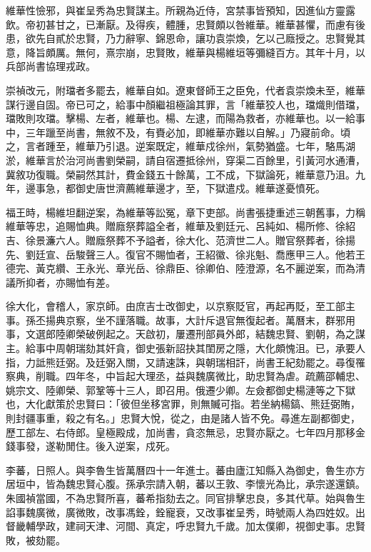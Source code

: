 \begin{pinyinscope}
維華性憸邪，與崔呈秀為忠賢謀主。所親為近侍，宮禁事皆預知，因進仙方靈露飲。帝初甚甘之，已漸厭。及得疾，體腫，忠賢頗以咎維華。維華甚懼，而慮有後患，欲先自貳於忠賢，乃力辭寧、錦恩命，讓功袁崇煥，乞以己廕授之。忠賢覺其意，降旨頗厲。無何，熹宗崩，忠賢敗，維華與楊維垣等彌縫百方。其年十月，以兵部尚書協理戎政。

崇禎改元，附璫者多罷去，維華自如。遼東督師王之臣免，代者袁崇煥未至，維華謀行邊自固。帝已可之，給事中顏繼祖極論其罪，言「維華狡人也，璫熾則借璫，璫敗則攻璫。擊楊、左者，維華也。楊、左逮，而陽為救者，亦維華也。以一給事中，三年躐至尚書，無敘不及，有賚必加，即維華亦難以自解。」乃寢前命。頃之，言者踵至，維華乃引退。逆案既定，維華戍徐州，氣勢猶盛。七年，駱馬湖淤，維華言於治河尚書劉榮嗣，請自宿遷抵徐州，穿渠二百餘里，引黃河水通漕，冀敘功復職。榮嗣然其計，費金錢五十餘萬，工不成，下獄論死，維華意乃沮。九年，邊事急，都御史唐世濟薦維華邊才，至，下獄遣戍。維華遂憂憤死。

福王時，楊維坦翻逆案，為維華等訟冤，章下吏部。尚書張捷重述三朝舊事，力稱維華等忠，追賜恤典。贈廕祭葬謚全者，維華及劉廷元、呂純如、楊所修、徐紹吉、徐景濂六人。贈廕祭葬不予謚者，徐大化、范濟世二人。贈官祭葬者，徐揚先、劉廷宣、岳駿聲三人。復官不賜恤者，王紹徽、徐兆魁、喬應甲三人。他若王德完、黃克纘、王永光、章光岳、徐鼎臣、徐卿伯、陸澄源，名不麗逆案，而為清議所抑者，亦賜恤有差。

徐大化，會稽人，家京師。由庶吉士改御史，以京察貶官，再起再貶，至工部主事。孫丕揚典京察，坐不謹落職。故事，大計斥退官無復起者。萬曆末，群邪用事，文選郎陸卿榮破例起之。天啟初，屢遷刑部員外郎，結魏忠賢、劉朝，為之謀主。給事中周朝瑞劾其奸貪，御史張新詔抉其閨房之隱，大化頗愧沮。已，承要人指，力詆熊廷弼。及廷弼入關，又請速誅，與朝瑞相訐，尚書王紀劾罷之。尋復罹察典，削職。四年冬，中旨起大理丞，益與魏廣微比，助忠賢為虐。疏薦邵輔忠、姚宗文、陸卿榮、郭鞏等十三人，即召用。俄遷少卿。左僉都御史楊漣等之下獄也，大化獻策於忠賢曰：「彼但坐移宮罪，則無贓可指。若坐納楊鎬、熊廷弼賄，則封疆事重，殺之有名。」忠賢大悅，從之，由是諸人皆不免。尋進左副都御史，歷工部左、右侍郎。皇極殿成，加尚書，貪恣無忌，忠賢亦厭之。七年四月那移金錢事發，遂勒閒住。後入逆案，戍死。

李蕃，日照人。與李魯生皆萬曆四十一年進士。蕃由廬江知縣入為御史，魯生亦方居垣中，皆為魏忠賢心腹。孫承宗請入朝，蕃以王敦、李懷光為比，承宗遂還鎮。朱國禎當國，不為忠賢所喜，蕃希指劾去之。同官排擊忠良，多其代草。始與魯生諂事魏廣微，廣微敗，改事馮銓，銓寵衰，又改事崔呈秀，時號兩人為四姓奴。出督畿輔學政，建祠天津、河間、真定，呼忠賢九千歲。加太僕卿，視御史事。忠賢敗，被劾罷。


\end{pinyinscope}

